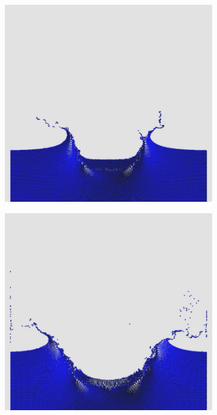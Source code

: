 \documentclass[12pt,a4paper,dvipsnames]{article}
\begin{document}
\begin{figure}[!h]
\begin{subfigure}[!h]{0.3\textwidth}
	\end{subfigure}
	\begin{subfigure}[!h]{0.3\textwidth} \centering
		\includegraphics[width=\textwidth]{WD/WD-05.jpg}
	\end{subfigure}
	\begin{subfigure}[!h]{0.3\textwidth} \centering
		\includegraphics[width=\textwidth]{WD/WD-06.jpg}

\end{subfigure}
\end{figure}
\end{document}
